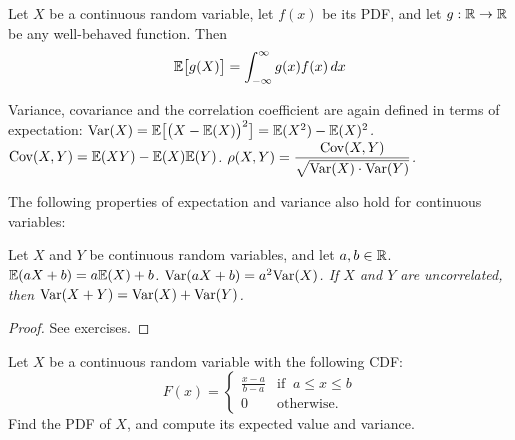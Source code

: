 
\begin{theorem}\label{lem:law_unconscious_statistician_cts}
Let $X$ be a continuous random variable, let $f(x)$ be its PDF, and let $g:\mathbb{R}\to\mathbb{R}$ be any well-behaved function. Then
\[
\mathbb{E}\big[g(X)\big] = \int_{-\infty}^{\infty} g(x)f(x)\,dx
\]
\end{theorem}
\proofomitted

\begin{definition}
Variance, covariance and the correlation coefficient are again defined in terms of expectation:
\ben
\it $\text{Var}(X) = \mathbb{E}\big[\big(X-\mathbb{E}(X)\big)^2\big] = \mathbb{E}(X^2) - \mathbb{E}(X)^2$.
\it $\text{Cov}(X,Y) = \mathbb{E}(XY) - \mathbb{E}(X)\mathbb{E}(Y)$.
\it $\rho(X,Y) = \displaystyle\frac{\text{Cov}(X,Y)}{\sqrt{\text{Var}(X)\cdot\text{Var}(Y)}}$.
\een
\end{definition}

The following properties of expectation and variance also hold for continuous variables:
\begin{theorem}
Let $X$ and $Y$ be continuous random variables, and let $a,b\in\mathbb{R}$.
\ben
\it $\mathbb{E}(aX+b) = a\mathbb{E}(X) + b$.
\it $\text{Var}(aX+b) = a^2\text{Var}(X)$.
\it If $X$ and $Y$ are uncorrelated, then $\text{Var}(X+Y)=\text{Var}(X)+\text{Var}(Y)$.
\een
\end{theorem}

\begin{proof}
\hideoff
See exercises.
\hideon
\end{proof}


\begin{example}\label{ex:continuous_uniform}
Let $X$ be a continuous random variable with the following CDF:
\[
F(x) = \begin{cases}
	\displaystyle\frac{x-a}{b-a}	& \text{if }\ a\leq x\leq b \\[2ex]
	0							& \text{otherwise.}
\end{cases}	
\]
Find the PDF of $X$, and compute its expected value and variance.
\end{example}

